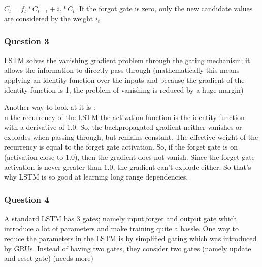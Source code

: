 \documentclass[10pt]{article}
\begin{document}
$C_t = f_t * C_{t-1}+i_t * \widetilde{C_t}$. If the forgot gate is zero, only the new candidate values are considered by the weight $i_t$

\subsubsection{Question 3}
LSTM solves the vanishing gradient problem through the gating mechanism; it allows the information to directly pass through (mathematically this means applying an identity function over the inputs and because the gradient of the identity function is 1, the problem of vanishing is reduced by a huge margin)

Another way to look at it is : \\
n the recurrency of the LSTM the activation function is the identity function with a derivative of 1.0. So, the backpropagated gradient neither vanishes or explodes when passing through, but remains constant.
The effective weight of the recurrency is equal to the forget gate activation. So, if the forget gate is on (activation close to 1.0), then the gradient does not vanish. Since the forget gate activation is never greater than 1.0, the gradient can't explode either.
So that's why LSTM is so good at learning long range dependencies. 

\subsubsection{Question 4}
A standard LSTM has 3 gates; namely input,forget and output gate which introduce a lot of parameters and make training quite a hassle.
One way to reduce the parameters in the LSTM is by simplified gating which was introduced by GRUs. Instead of having two gates, they consider two gates (namely update and reset gate) (needs more)
\end{document}
